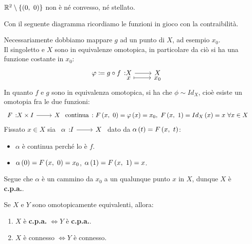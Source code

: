 \begin{example}
$\realset^2\setminus\left\{\left(0,\ 0\right)\right\}$ non è né convesso, né stellato.
\end{example}
\begin{lemming}
\end{lemming}
\begin{demonstration} Con il seguente diagramma ricordiamo le funzioni in gioco con la contraibilità.
\begin{center}
\end{center}
Necessariamente dobbiamo mappare $g$ ad un punto di $X$, ad esempio $x_0$.  \\
Il singoletto e $X$ sono in equivalenze omotopica, in particolare da ciò si ha una funzione costante in $x_0$:
\begin{equation*}
	\funztot{\phi\coloneqq g\circ f}{X}{X}{x}{x_0}
\end{equation*}
In quanto $f$ e $g$ sono in equivalenza omotopica, si ha che $\phi\sim Id_X$, cioè esiste un omotopia fra le due funzioni:
\begin{equation*}
	\funz{F}{X\times I}{X}\text{ continua}\ \colon \mvf{F}{x}{0}=\phi\left(x\right)=x_0,\ \mvf{F}{x}{1}=Id_X\left(x\right)=x\ \forall x\in X
\end{equation*}
Fissato $x\in X$ sia $\funz{\alpha}{I}{X}$ dato da $\alpha\left(t\right)=F\left(x,\ t\right)$:
\begin{itemize}
	\item $\alpha$ è continua perché lo è $f$.
	\item $\alpha\left(0\right)=F\left(x,\ 0\right)=x_0$, $\alpha\left(1\right)=F\left(x,\ 1\right)=x$.
\end{itemize}
Segue che $\alpha$ è un cammino da $x_0$ a un qualunque punto $x$ in $X$, dunque $X$ è \textbf{c.p.a.}.
\end{demonstration}
\begin{exercise}
Se $X$ e $Y$ sono omotopicamente equivalenti, allora:
\begin{enumerate}
\item $X$ è \textbf{c.p.a.} $\iff Y$ è \textbf{c.p.a.}.
\item $X$ è connesso $\iff Y$ è connesso.
\end{enumerate}
\vspace{-3mm}
\end{exercise}
